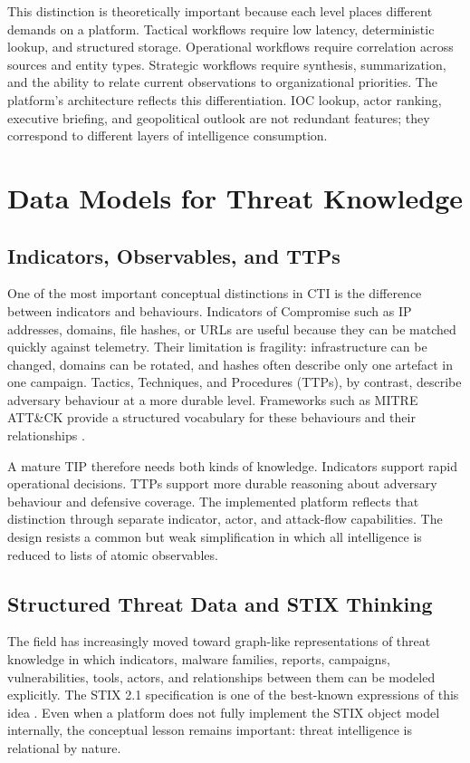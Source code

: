 This distinction is theoretically important because each level places different demands on a platform. Tactical workflows require low latency, deterministic lookup, and structured storage. Operational workflows require correlation across sources and entity types. Strategic workflows require synthesis, summarization, and the ability to relate current observations to organizational priorities. The platform's architecture reflects this differentiation. IOC lookup, actor ranking, executive briefing, and geopolitical outlook are not redundant features; they correspond to different layers of intelligence consumption.

\section{Data Models for Threat Knowledge}
\subsection{Indicators, Observables, and TTPs}
One of the most important conceptual distinctions in CTI is the difference between indicators and behaviours. Indicators of Compromise such as IP addresses, domains, file hashes, or URLs are useful because they can be matched quickly against telemetry. Their limitation is fragility: infrastructure can be changed, domains can be rotated, and hashes often describe only one artefact in one campaign. Tactics, Techniques, and Procedures (TTPs), by contrast, describe adversary behaviour at a more durable level. Frameworks such as MITRE ATT\&CK provide a structured vocabulary for these behaviours and their relationships \cite{mitre_attack}.

A mature TIP therefore needs both kinds of knowledge. Indicators support rapid operational decisions. TTPs support more durable reasoning about adversary behaviour and defensive coverage. The implemented platform reflects that distinction through separate indicator, actor, and attack-flow capabilities. The design resists a common but weak simplification in which all intelligence is reduced to lists of atomic observables.

\subsection{Structured Threat Data and STIX Thinking}
The field has increasingly moved toward graph-like representations of threat knowledge in which indicators, malware families, reports, campaigns, vulnerabilities, tools, actors, and relationships between them can be modeled explicitly. The STIX 2.1 specification is one of the best-known expressions of this idea \cite{stix21_spec}. Even when a platform does not fully implement the STIX object model internally, the conceptual lesson remains important: threat intelligence is relational by nature.

